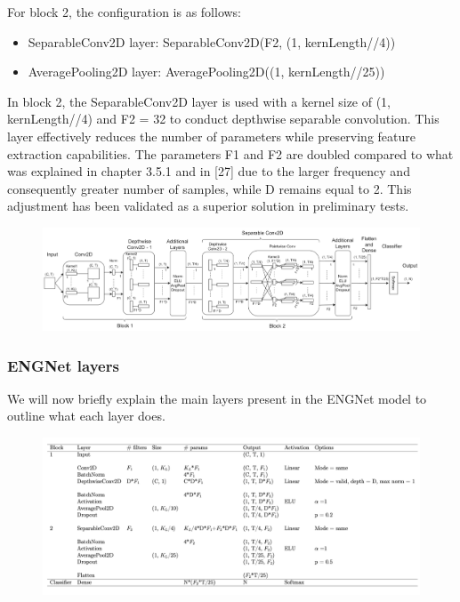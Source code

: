 \documentclass{Configuration_Files/PoliMi3i_thesis}
\begin{document}
For block 2, the configuration is as follows:
\begin{itemize}
\item SeparableConv2D layer: SeparableConv2D(F2, (1, kernLength//4))
\item AveragePooling2D layer: AveragePooling2D((1, kernLength//25))
\end{itemize}

In block 2, the SeparableConv2D layer is used with a kernel size of (1, kernLength//4) and F2 = 32 to conduct depthwise separable convolution. This layer effectively reduces the number of parameters while preserving feature extraction capabilities. The parameters F1 and F2 are doubled compared to what was explained in chapter 3.5.1 and in [27] due to the larger frequency and consequently greater number of samples, while D remains equal to 2. This adjustment has been validated as a superior solution in preliminary tests.

\begin{figure}[H]
	\includegraphics[scale=0.4]{engNet_arch.png}
	\centering
\end{figure}
	

\subsubsection{ENGNet layers}

We will now briefly explain the main layers present in the ENGNet model to outline what each layer does.



\begin{figure}[H]
	\includegraphics[scale=0.25]{engNet_layers.png}
	\centering
\end{figure}
\end{document}
